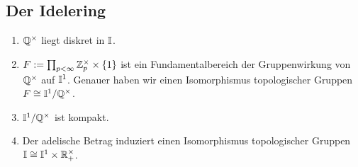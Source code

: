 	\subsection{Der Idelering}
		\begin{satz}
			\begin{enumerate}[label=\emph{(\alph*)}]
				\item $\mathbb{Q}^\times$ liegt diskret in $\mathbb{I}$.
				\item $F:=\prod_{p<\infty}\mathbb{Z}_p^\times \times \{1\}$ ist ein Fundamentalbereich der Gruppenwirkung von $\mathbb{Q}^\times$ auf $\mathbb{I}^1$. Genauer haben wir einen Isomorphismus topologischer Gruppen $F \cong \mathbb{I}^1/\mathbb{Q}^\times$.
				\item $\mathbb{I}^1/\mathbb{Q}^\times$ ist kompakt.
				\item Der adelische Betrag induziert einen Isomorphismus topologischer Gruppen $\mathbb{I} \cong \mathbb{I}^1 \times \mathbb{R}^\times_+$.
			\end{enumerate}
		\end{satz}
	